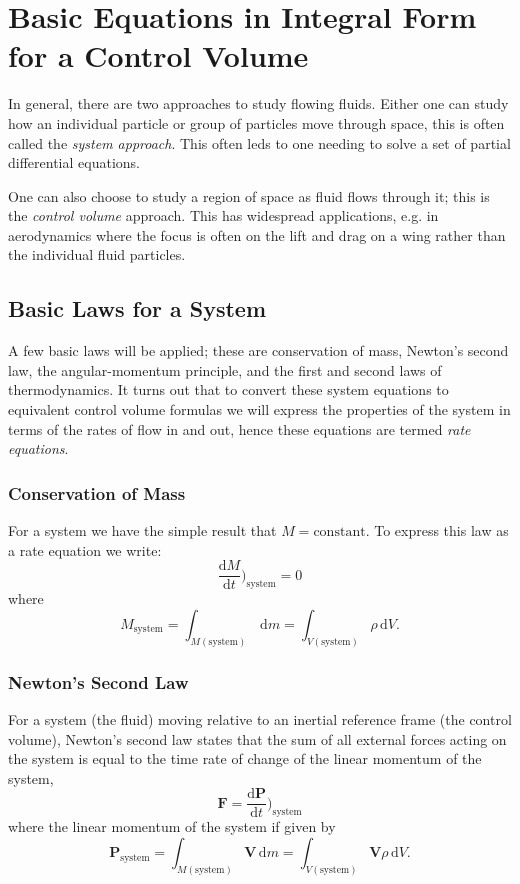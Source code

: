 
\section{Basic Equations in Integral Form for a Control Volume} \label{sec:intconvol}
In general, there are two approaches to study flowing fluids. Either one can study how an individual particle or group of particles move through space, this is often called the \textit{system approach}. This often leds to one needing to solve a set of partial differential equations.

One can also choose to study a region of space as fluid flows through it; this is the \textit{control volume} approach. This has widespread applications, e.g. in aerodynamics where the focus is often on the lift and drag on a wing rather than the individual fluid particles.

\subsection{Basic Laws for a System}
A few basic laws will be applied; these are conservation of mass, Newton's second law, the angular-momentum principle, and the first and second laws of thermodynamics. It turns out that to convert these system equations to equivalent control volume formulas we will express the properties of the system in terms of the rates of flow in and out, hence these equations are termed \textit{rate equations}.

\subsubsection{Conservation of Mass} \label{afs:consmass}
For a system we have the simple result that $M = \mathrm{constant}$. To express this law as a rate equation we write:
\[ 
\frac{\mathrm{d}M}{\mathrm{d}t} \bigg)_{\mathrm{system}} = 0
\]
where
\[ 
M_{\mathrm{system}} = \int_{M (\mathrm{system})} \, \mathrm{d}m = \int_{V \left( \mathrm{system} \right)} \rho \, \mathrm{d}V
.\]

\subsubsection{Newton's Second Law} \label{afs:N2}
For a system (the fluid) moving relative to an inertial reference frame (the control volume), Newton's second law states that the sum of all external forces acting on the system is equal to the time rate of change of the linear momentum of the system,
\[ 
\textbf{F} = \frac{\mathrm{d}\textbf{P}}{\mathrm{d}t} \bigg)_{\mathrm{system}}
\]
where the linear momentum of the system if given by
\[ 
\textbf{P}_{\mathrm{system}} = \int_{M (\mathrm{system})} \textbf{V} \, \mathrm{d}m = \int_{V (\mathrm{system})} \textbf{V} \rho \, \mathrm{d}V
.\]

